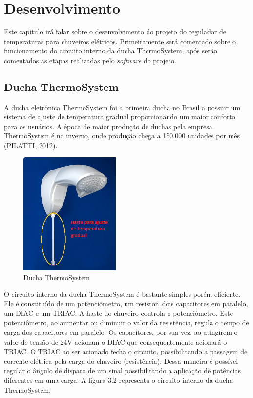 \chapter{Desenvolvimento}

Este capítulo irá falar sobre o desenvolvimento do projeto do regulador de temperaturas para chuveiros elétricos. Primeiramente será comentado sobre o funcionamento do circuito interno da ducha ThermoSystem, após serão comentados as etapas realizadas pelo \textit{software} do projeto.

\section{Ducha ThermoSystem}

A ducha eletrônica ThermoSystem foi a primeira ducha no Brasil a possuir um sistema de ajuste de temperatura gradual proporcionando um maior conforto para os usuários. A época de maior produção de duchas pela empresa ThermoSystem é no inverno, onde produção chega a 150.000 unidades por mês (PILATTI, 2012).

\begin{figure}[!htb]

\center

\includegraphics[width=5cm]{imagens/ducha_thermosystem.png}

\label{Ducha ThermoSystem}

\caption{Ducha ThermoSystem}

\end{figure}

O circuito interno da ducha ThermoSystem é bastante simples porém eficiente. Ele é constituído de um potenciômetro, um resistor, dois capacitores em paralelo, um DIAC e um TRIAC. A haste do chuveiro controla o potenciômetro. Este potenciômetro, ao aumentar ou diminuir o valor da resistência, regula o tempo de carga dos capacitores em paralelo. Os capacitores, por sua vez, ao atingirem o valor de tensão de 24V acionam o DIAC que consequentemente acionará o TRIAC. O TRIAC ao ser acionado fecha o circuito, possibilitando a passagem de corrente elétrica pela carga do chuveiro (resistência). Dessa maneira é possível regular o ângulo de disparo de um sinal possibilitando a aplicação de potências diferentes em uma carga. A figura 3.2 representa o circuito interno da ducha ThermoSystem.




